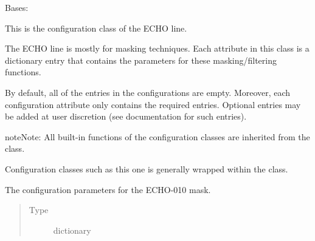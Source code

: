 \documentclass[letterpaper,10pt,english]{sphinxmanual}
\begin{document}
\begin{fulllineitems}
\label{\detokenize{python_docstrings/IfA_Smeargle.yankee.configuration_classes.EchoConfig_file:IfA_Smeargle.yankee.configuration_classes.EchoConfig_file.EchoConfig}}
Bases: {\hyperref[\detokenize{python_docstrings/IfA_Smeargle.yankee.configuration_classes.BaseConfig_file:IfA_Smeargle.yankee.configuration_classes.BaseConfig_file.BaseConfig}]{}}

This is the configuration class of the ECHO line.

The ECHO line is mostly for masking techniques. Each attribute in this
class is a dictionary entry that contains the parameters for these
masking/filtering functions.

By default, all of the entries in the configurations are empty.
Moreover, each configuration attribute only contains the required
entries. Optional entries may be added at user discretion (see
documentation for such entries).

\begin{sphinxadmonition}{note}{Note:}
All built-in functions of the configuration classes are inherited from the
{\hyperref[\detokenize{python_docstrings/IfA_Smeargle.yankee.configuration_classes.BaseConfig_file:IfA_Smeargle.yankee.configuration_classes.BaseConfig_file.BaseConfig}]{}}
class.

Configuration classes such as this one is generally wrapped within the
{\hyperref[\detokenize{python_docstrings/IfA_Smeargle.yankee.yankee_main:IfA_Smeargle.yankee.yankee_main.SmeargleConfig}]{}} class.
\end{sphinxadmonition}

\begin{fulllineitems}
\label{\detokenize{python_docstrings/IfA_Smeargle.yankee.configuration_classes.EchoConfig_file:IfA_Smeargle.yankee.configuration_classes.EchoConfig_file.EchoConfig.echo010_config}}
The configuration parameters for the ECHO-010 mask.
\begin{quote}\begin{description}
\item[{Type}] \leavevmode
dictionary


\end{description}
\end{quote}
\end{fulllineitems}
\end{fulllineitems}
\end{document}

